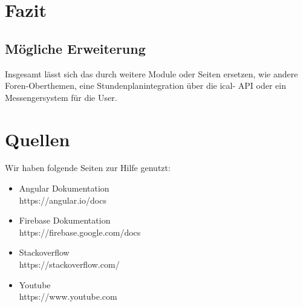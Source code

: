 \documentclass[12pt,titlepage]{article}
\begin{document}
\FloatBarrier

\section{Fazit}



\subsection{Mögliche Erweiterung}

Insgesamt lässt sich das durch weitere Module oder Seiten ersetzen, wie andere Foren-Oberthemen, eine Stundenplanintegration über die ical- API oder 
ein Messengersystem für die User.
\newpage
\section{Quellen}

Wir haben folgende Seiten zur Hilfe genutzt:

\begin{itemize}
\item
Angular Dokumentation \\
https://angular.io/docs

 \item 
 Firebase Dokumentation \\
https://firebase.google.com/docs

\item
Stackoverflow \\
https://stackoverflow.com/

\item
Youtube \\
https://www.youtube.com

\end{itemize}
\end{document}
